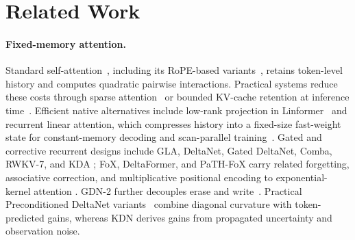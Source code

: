 \documentclass{article} %
\begin{document}
\FloatBarrier

\vspace{-1mm}
\section{Related Work}
\vspace{-1mm}
\label{sec:related-work}

\paragraph{Fixed-memory attention.}
Standard self-attention~\citep{vaswani2017attention}, including its RoPE-based variants~\citep{su2024roformer}, retains token-level history and computes quadratic pairwise interactions. Practical systems reduce these costs through sparse attention~\citep{liu2025deepseek} or bounded KV-cache retention at inference time~\citep{xiao2024efficient,bui2026cache,bui2026make}. Efficient native alternatives include low-rank
projection in Linformer~\citep{wang2020linformer} and recurrent linear attention, which compresses
history into a fixed-size fast-weight state for constant-memory decoding and scan-parallel
training~\citep{katharopoulos2020transformers}. Gated and corrective recurrent designs include GLA,
DeltaNet, Gated DeltaNet, Comba, RWKV-7, and KDA
\citep{yang2023gated,schlag2021linear,yang2024gdn,hu2025comba,
peng2025rwkv7,kimiteam2025kimilinear}; FoX, DeltaFormer, and PaTH-FoX carry related forgetting,
associative correction, and multiplicative positional encoding to exponential-kernel attention
\citep{lin2025forgetting,zhong2025understanding,yang2025path}. GDN-2 further decouples erase and
write~\citep{hatamizadeh2026gdn2}. Practical Preconditioned DeltaNet variants~\citep{tumma2026preconditioned}
combine diagonal curvature with token-predicted gains, whereas KDN derives gains from propagated
uncertainty and observation noise.
\end{document}
